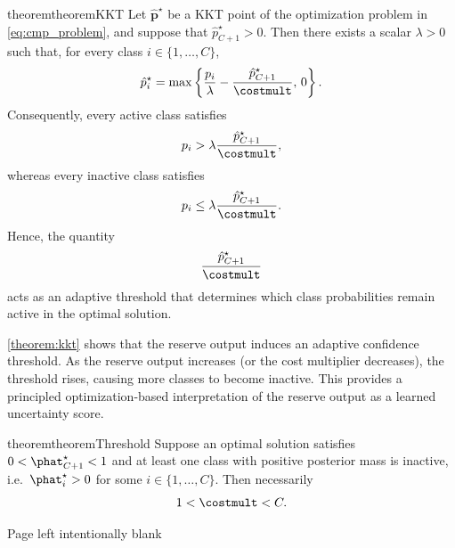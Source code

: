 \begin{restatable}{theorem}{theoremKKT}
    \label{theorem:kkt}
    Let $\hat{\mathbf p}^\star$ be a KKT point of the optimization problem in
    \eqref{eq:cmp_problem}, and suppose that $\hat p^\star_{C+1}>0$. Then there exists
    a scalar $\lambda>0$ such that, for every class $i\in\{1,\ldots,C\}$,
    \begin{align}
        \hat p_i^\star
        =
        \max\left\{
        \frac{p_i}{\lambda}
        -
        \frac{\hat p_{C+1}^\star}{\costmult},
        \,0
        \right\}.
    \end{align}
    Consequently, every active class satisfies
    \begin{align}
        p_i>\lambda\frac{\hat p_{C+1}^\star}{\costmult},
    \end{align}
    whereas every inactive class satisfies
    \begin{align}
        p_i\le
        \lambda\frac{\hat p_{C+1}^\star}{\costmult}.
    \end{align}
    Hence, the quantity
    \[
        \frac{\hat p_{C+1}^\star}{\costmult}
    \]
    acts as an adaptive threshold that determines which class probabilities remain active in the optimal solution.
\end{restatable}

\cref{theorem:kkt} shows that the reserve output induces an adaptive confidence threshold. As the reserve output increases (or the cost multiplier decreases), the threshold rises, causing more classes to become inactive. This provides a principled optimization-based interpretation of the reserve output as a learned uncertainty score.

\begin{restatable}{theorem}{theoremThreshold}
    \label{theorem:threshold}
    Suppose an optimal solution satisfies \(0<\phat^{\star}_{C+1}<1\) and at least one class with positive posterior mass is inactive, i.e.\ \(\phat^{\star}_i>0\) for some \(i
    \in \{1, \dots, C\}\). Then necessarily \[ 1<\costmult<C.\]
\end{restatable}

\clearpage

Page left intentionally blank

\clearpage